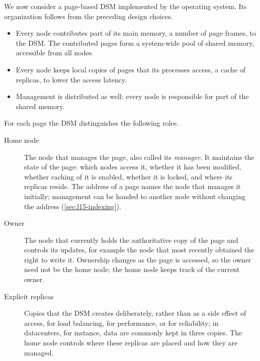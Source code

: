 \documentclass[../main.tex]{subfiles}
\begin{document}
We now consider a page-based DSM implemented by the operating
system.  Its organization follows from the
preceding design choices.
\begin{itemize}
  \item Every node contributes part of its main memory, a number of page
    frames, to the DSM.  The contributed pages form a system-wide pool of
    shared memory, accessible from all nodes.
  \item Every node keeps local copies of pages that its processes access, a
    cache of replicas, to lower the access latency.
  \item Management is distributed as well: every node is responsible for
    part of the shared memory.
\end{itemize}
For each page the DSM distinguishes the following roles.
\begin{description}
  \item[Home node] The node that manages the page, also called its
    \emph{manager}.  It maintains the state of the page: which nodes access
    it, whether it has been modified, whether caching of it is enabled,
    whether it is locked, and where its replicas reside.  The address of a
    page names the node that manages it initially; management can be handed
    to another node without changing the address
    (\cref{sec:l15-indexing}).
  \item[Owner] The node that currently holds the authoritative copy of the
    page and controls its updates, for example the node that most recently
    obtained the right to write it.  Ownership changes as the page is
    accessed, so the owner need not be the home node; the home node keeps
    track of the current owner.
  \item[Explicit replicas] Copies that the DSM creates deliberately, rather
    than as a side effect of access, for load balancing, for performance,
    or for reliability; in datacenters, for instance, data are commonly
    kept in three copies.  The home node controls where these
    replicas are placed and how they are managed.
\end{description}
\end{document}
